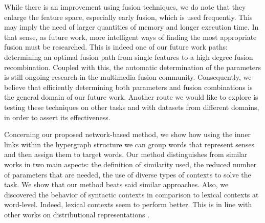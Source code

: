 While there is an improvement using fusion techniques, we do note that they  enlarge the feature space, especially early fusion, which is used frequently. This may imply the need of larger quantities of memory and longer execution time. In that sense, as future work, more intelligent ways of finding the most appropriate fusion must be researched. This is indeed one of our future work paths: determining an optimal fusion path from single features to a high degree fusion recombination. Coupled with this, the automatic determination of the parameters is still ongoing research in the multimedia fusion community. Consequently, we believe that efficiently determining both parameters and fusion combinations is the general domain of our future work. Another route we would like to explore is testing these techniques on other tasks and with datasets from different domains, in order to assert its effectiveness.


Concerning our proposed network-based method, we show how using the inner links within the hypergraph structure we can group words that represent senses and then assign them to target words. Our method distinguishes from similar works in two main aspects: the definition of similarity used, the reduced number of parameters that are needed, the use of diverse types of contexts to solve the task. 	We show that our method beats said similar approaches. Also, we discovered the behavior of syntactic contexts in comparison to lexical contexts at word-level. Indeed, lexical contexts seem to perform better. This is in line with other works on distributional representations \cite{kiela2014systematic}.




